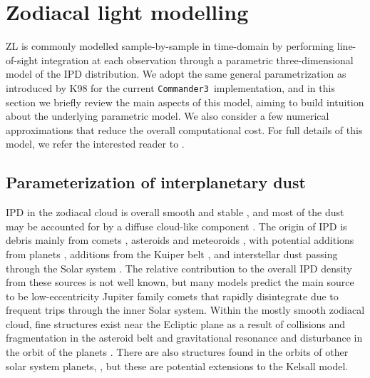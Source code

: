 \documentclass[twocolumn]{aa}
\def\commanderthree{\texttt{Commander3}}
\begin{document}
\section{Zodiacal light modelling}\label{sect:zodi-model}
ZL is commonly modelled sample-by-sample in time-domain by performing
line-of-sight integration at each observation through a parametric
three-dimensional model of the IPD distribution. We adopt the same
general parametrization as introduced by K98 for the current
\commanderthree\ implementation, and in this section we briefly review
the main aspects of this model, aiming to build intuition about the
underlying parametric model. We also consider a few numerical
approximations that reduce the overall computational cost. For full
details of this model, we refer the interested reader to
\citet{Kelsall1998}.

\subsection{Parameterization of interplanetary dust}
IPD in the zodiacal cloud is overall smooth and stable 
\citep{Leinert1989}, and most of the dust may be accounted for by a 
diffuse cloud-like component \citep{Kelsall1998}. The origin of IPD 
is debris mainly from comets \citep{Liou1995, rigley, ipatov}, asteroids \citep{Dermott1984} and meteoroids \citep{dikarev}, 
with potential additions from planets \citep{Jorgensen2021}, additions from 
the Kuiper belt \citep{Mann2009}, and interstellar dust passing 
through the Solar system \citep{Robinson2013}. The relative contribution to the overall 
IPD density from these sources is not well known, but many models predict the main 
source to be low-eccentricity Jupiter family comets that rapidly 
disintegrate due to frequent trips through the inner Solar system.
Within the mostly smooth zodiacal cloud, fine structures exist near the Ecliptic plane as a result 
of collisions and fragmentation in the asteroid belt and gravitational 
resonance and disturbance in the orbit of the planets \citep{Low1984, Dermott1984, Dermott1994, Reach1997}. There are also structures found in the orbits of other solar system planets, \citep{kennedy, jones_venus, Stenborg}, but these are potential extensions to the Kelsall model.  
\end{document}
